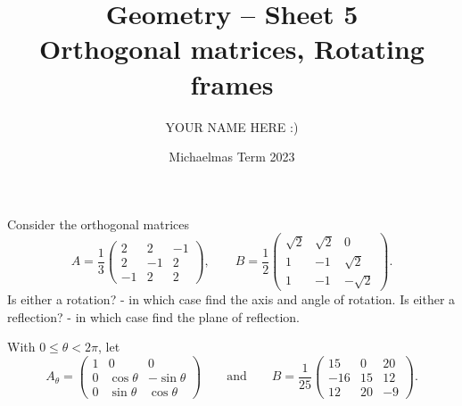 \documentclass[answers]{exam}
\title{Geometry -- Sheet 5\\Orthogonal matrices, Rotating frames}
\author{YOUR NAME HERE :)}
\date{Michaelmas Term 2023}
\begin{document}
\maketitle
\begin{questions}

\question%
Consider the orthogonal matrices \[
	A=\frac{1}{3}\begin{pmatrix}
		2 & 2 & -1 \\
		2 & -1 & 2 \\
		-1 & 2 & 2
	\end{pmatrix},\qquad
	B=\frac{1}{2}\begin{pmatrix}
		\sqrt{2} & \sqrt{2} & 0 \\
		1 & -1 & \sqrt{2} \\
		1 & -1 & -\sqrt{2}
	\end{pmatrix}.
\] Is either a rotation? - in which case find the axis and angle of rotation. Is either a reflection? - in which case find the plane of reflection.



\question%
With $0 \leqslant \theta<2 \pi$, let \[
	A_{\theta}=\begin{pmatrix}
		1 & 0 & 0 \\
		0 & \cos \theta & -\sin \theta \\
		0 & \sin \theta & \cos \theta
	\end{pmatrix}
	\qquad\text{and}\qquad
	B=\frac{1}{25}\begin{pmatrix}
		15 & 0 & 20 \\
		-16 & 15 & 12 \\
		12 & 20 & -9
	\end{pmatrix}.
\]




\end{questions}
\end{document}
